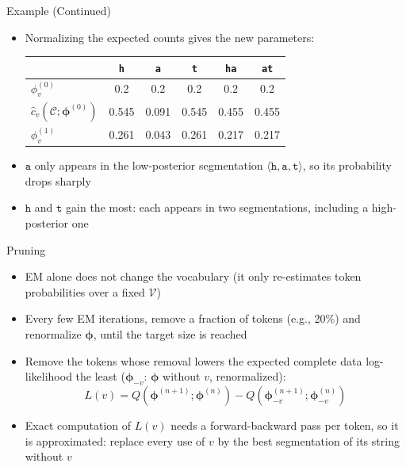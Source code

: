 \documentclass[11pt,compress,t,notes=noshow, xcolor=table]{beamer}
\newcommand{\vocab}{\mathcal{V}}
\newcommand{\probs}{\boldsymbol{\phi}}
\begin{document}
 
\begin{frame}{Example (Continued)}
 
\vfill
 
\begin{itemize}
\item Normalizing the expected counts gives the new parameters:
\begin{center}
\renewcommand{\arraystretch}{1.3}
\begin{tabular}{lccccc}
 & \texttt{h} & \texttt{a} & \texttt{t} & \texttt{ha} & \texttt{at} \\
\hline
\rule{0pt}{2.8ex}$\phi^{(0)}_v$ & 0.2 & 0.2 & 0.2 & 0.2 & 0.2 \\
$\hat{c}_v(\mathcal{C}; \probs^{(0)})$ & 0.545 & 0.091 & 0.545 & 0.455 & 0.455 \\
$\phi^{(1)}_v$ & 0.261 & 0.043 & 0.261 & 0.217 & 0.217
\end{tabular}
\end{center}
\item $\texttt{a}$ only appears in the low-posterior segmentation $\langle \texttt{h}, \texttt{a}, \texttt{t} \rangle$, so its probability drops sharply
\item $\texttt{h}$ and $\texttt{t}$ gain the most: each appears in two segmentations, including a high-posterior one
\end{itemize}
 
\vfill
 
\end{frame}
 
\begin{frame}{Pruning}
 
\vfill
 
\begin{itemize}
\item EM alone does not change the vocabulary (it only re-estimates token probabilities over a fixed $\vocab$)
\item Every few EM iterations, remove a fraction of tokens (e.g., 20\%) and renormalize $\probs$, until the target size is reached
\item Remove the tokens whose removal lowers the expected complete data log-likelihood  the least ($\probs_{-v}$: $\probs$ without $v$, renormalized):
\begin{equation*}
L(v) = Q(\probs^{(n+1)}; \probs^{(n)}) - Q(\probs_{-v}^{(n+1)}; \probs^{(n)}_{-v})
\end{equation*}
\item Exact computation of $L(v)$ needs a forward-backward pass per token, so it is approximated: replace every use of $v$ by the best segmentation of its string without $v$
\end{itemize}
 
\vfill
 
\end{frame}
\end{document}
